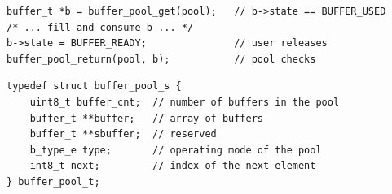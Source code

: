 \begin{listing}
\begin{verbatim}
buffer_t *b = buffer_pool_get(pool);   // b->state == BUFFER_USED
/* ... fill and consume b ... */
b->state = BUFFER_READY;               // user releases
buffer_pool_return(pool, b);           // pool checks
\end{verbatim}
\caption{Life cycle of a pool buffer}
\label{buffer_pool_lifecycle}
\end{listing}

\begin{listing}
\begin{verbatim}
typedef struct buffer_pool_s {
    uint8_t buffer_cnt;  // number of buffers in the pool
    buffer_t **buffer;   // array of buffers
    buffer_t **sbuffer;  // reserved
    b_type_e type;       // operating mode of the pool
    int8_t next;         // index of the next element
} buffer_pool_t;
\end{verbatim}
\caption{Definition of the \texttt{buffer\_pool\_t} structure}
\label{buffer_pool_t}
\end{listing}

